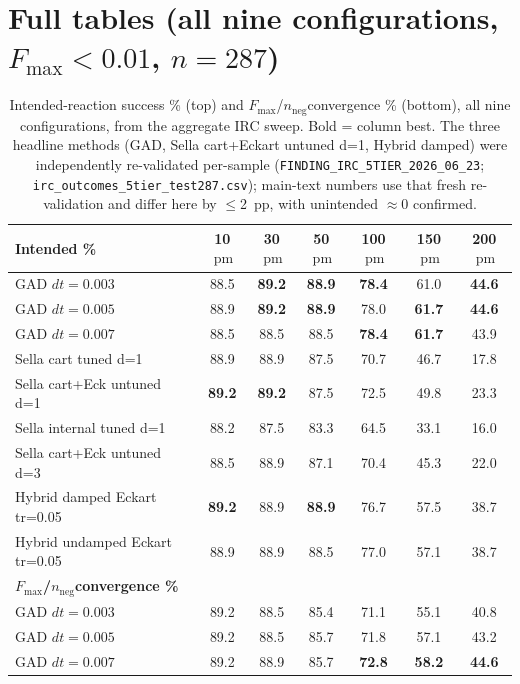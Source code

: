 \documentclass[11pt]{article}
\newcommand{\fmax}{\ensuremath{F_{\mathrm{max}}}}
\newcommand{\nneg}{\ensuremath{n_{\mathrm{neg}}}}
\renewcommand{\pm}{\ensuremath{\,\text{pm}}}
\begin{document}
\section{Full tables (all nine configurations, $\fmax<0.01$, $n=287$)}\label{app:fulltables}
\begin{table}[H]\centering\footnotesize
\caption{Intended-reaction success \% (top) and \fmax/\nneg convergence \% (bottom), all
nine configurations, from the aggregate IRC sweep. Bold = column best. The three
headline methods (GAD, Sella cart+Eckart untuned d=1, Hybrid damped) were
independently re-validated per-sample (\texttt{FINDING\_IRC\_5TIER\_2026\_06\_23};
\texttt{irc\_outcomes\_5tier\_test287.csv}); main-text numbers use that fresh
re-validation and differ here by $\le$2~pp, with unintended $\approx 0$ confirmed.}
\begin{tabular}{l cccccc}
\toprule
\textbf{Intended \%} & \textbf{10\pm} & \textbf{30\pm} & \textbf{50\pm} & \textbf{100\pm} & \textbf{150\pm} & \textbf{200\pm} \\
\midrule
GAD $dt=0.003$ & 88.5 & \textbf{89.2} & \textbf{88.9} & \textbf{78.4} & 61.0 & \textbf{44.6} \\
GAD $dt=0.005$ & 88.9 & \textbf{89.2} & \textbf{88.9} & 78.0 & \textbf{61.7} & \textbf{44.6} \\
GAD $dt=0.007$ & 88.5 & 88.5 & 88.5 & \textbf{78.4} & \textbf{61.7} & 43.9 \\
Sella cart tuned d=1          & 88.9 & 88.9 & 87.5 & 70.7 & 46.7 & 17.8 \\
Sella cart+Eck untuned d=1    & \textbf{89.2} & \textbf{89.2} & 87.5 & 72.5 & 49.8 & 23.3 \\
Sella internal tuned d=1      & 88.2 & 87.5 & 83.3 & 64.5 & 33.1 & 16.0 \\
Sella cart+Eck untuned d=3    & 88.5 & 88.9 & 87.1 & 70.4 & 45.3 & 22.0 \\
Hybrid damped Eckart tr=0.05  & \textbf{89.2} & 88.9 & \textbf{88.9} & 76.7 & 57.5 & 38.7 \\
Hybrid undamped Eckart tr=0.05& 88.9 & 88.9 & 88.5 & 77.0 & 57.1 & 38.7 \\
\midrule
\textbf{\fmax/\nneg convergence \%} & & & & & & \\
\midrule
GAD $dt=0.003$ & 89.2 & 88.5 & 85.4 & 71.1 & 55.1 & 40.8 \\
GAD $dt=0.005$ & 89.2 & 88.5 & 85.7 & 71.8 & 57.1 & 43.2 \\
GAD $dt=0.007$ & 89.2 & 88.9 & 85.7 & \textbf{72.8} & \textbf{58.2} & \textbf{44.6} \\

\end{tabular}
\end{table}
\end{document}
